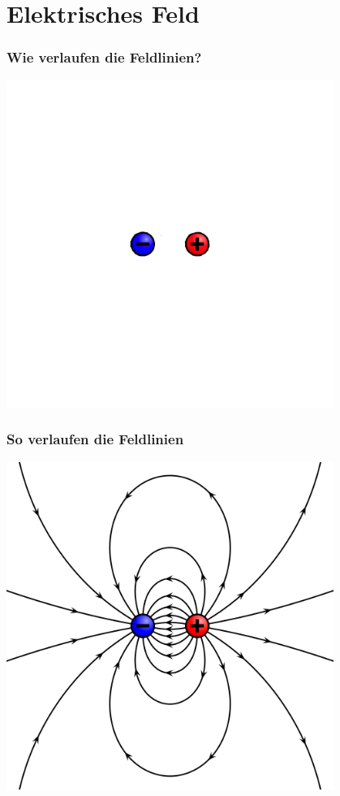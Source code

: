 \section*{Elektrisches Feld}

\begin{frame}
    \frametitle{Wie verlaufen die Feldlinien?}
    \begin{center}
        \includegraphics[width=0.8\textwidth,height=.8\textheight,keepaspectratio]{a08/VFPt_dipole_electric_ohne.png}
	{\tiny \hyperlink{refs}{\cite{wm}}}
    \end{center}
\end{frame}

\begin{frame}
    \frametitle{So verlaufen die Feldlinien}
    \begin{center}
        \includegraphics[width=0.8\textwidth,height=.8\textheight,keepaspectratio]{a08/VFPt_dipole_electric_mit.png}
	{\tiny \hyperlink{refs}{\cite{wm}}}
    \end{center}
\end{frame}

